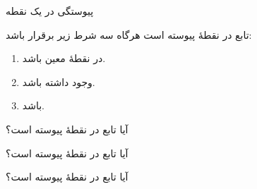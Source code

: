 
\EMhold


\begin{EMdefinition}{پیوستگی در یک نقطه}

تابع  در نقطهٔ  پیوسته است هرگاه سه شرط زیر برقرار باشد:

\begin{enumerate}
\def\labelenumi{\arabic{enumi}.}
\tightlist
\item
   در نقطهٔ  معین باشد.
\item
   وجود داشته باشد.
\item
   باشد.
\end{enumerate}

\end{EMdefinition}

\begin{EMexample}{}

آیا تابع  در نقطهٔ  پیوسته است؟

\end{EMexample}

\begin{EMexample}{}

آیا تابع
در نقطهٔ  پیوسته است؟

\end{EMexample}

\begin{EMexample}{}

آیا تابع
در نقطهٔ  پیوسته است؟

\end{EMexample}

\EMhold


